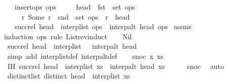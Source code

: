 \begin{isabellebody}
\ \ \ {\isachardoublequoteopen}insert{\isacharunderscore}ops\ ops{\isachardoublequoteclose}\isanewline
\ \ \ \ \ {\isachardoublequoteopen}head\ {\isasymnotin}\ fst\ {\isacharbackquote}\ set\ ops{\isachardoublequoteclose}\isanewline
\ \ \ \ \ {\isachardoublequoteopen}{\isasymAnd}r{\isachardot}\ Some\ r\ {\isasymin}\ snd\ {\isacharbackquote}\ set\ ops\ {\isasymLongrightarrow}\ r\ {\isasymnoteq}\ head{\isachardoublequoteclose}\isanewline
\ \ \ {\isachardoublequoteopen}succ{\isacharunderscore}rel\ {\isacharparenleft}head\ {\isacharhash}\ interp{\isacharunderscore}list\ ops{\isacharparenright}\ {\isacharequal}\ interp{\isacharunderscore}alt\ head\ ops{\isachardoublequoteclose}\isanewline
%
\isadelimproof
%
\endisadelimproof
%
\isatagproof
{}\isamarkupfalse%
\ assms\ \isamarkupfalse%
{\isacharparenleft}induction\ ops\ rule{\isacharcolon}\ List{\isachardot}rev{\isacharunderscore}induct{\isacharparenright}\isanewline
\ \ \isamarkupfalse%
\ Nil\isanewline
\ \ \isamarkupfalse%
\ \isamarkupfalse%
\ {\isachardoublequoteopen}succ{\isacharunderscore}rel\ {\isacharparenleft}head\ {\isacharhash}\ interp{\isacharunderscore}list\ {\isacharbrackleft}{\isacharbrackright}{\isacharparenright}\ {\isacharequal}\ interp{\isacharunderscore}alt\ head\ {\isacharbrackleft}{\isacharbrackright}{\isachardoublequoteclose}\isanewline
\ \ \ \ \isamarkupfalse%
\ {\isacharparenleft}simp\ add{\isacharcolon}\ interp{\isacharunderscore}list{\isacharunderscore}def\ interp{\isacharunderscore}alt{\isacharunderscore}def{\isacharparenright}\isanewline
{}\isamarkupfalse%
\isanewline
\ \ \isamarkupfalse%
\ {\isacharparenleft}snoc\ x\ xs{\isacharparenright}\isanewline
\ \ \isamarkupfalse%
\ IH{\isacharcolon}\ {\isachardoublequoteopen}succ{\isacharunderscore}rel\ {\isacharparenleft}head\ {\isacharhash}\ interp{\isacharunderscore}list\ xs{\isacharparenright}\ {\isacharequal}\ interp{\isacharunderscore}alt\ head\ xs{\isachardoublequoteclose}\isanewline
\ \ \ \ \isamarkupfalse%
\ snoc\ \isamarkupfalse%
\ auto\isanewline
\ \ \isamarkupfalse%
\ distinct{\isacharunderscore}list{\isacharcolon}\ {\isachardoublequoteopen}distinct\ {\isacharparenleft}head\ {\isacharhash}\ interp{\isacharunderscore}list\ xs{\isacharparenright}{\isachardoublequoteclose}\isanewline
\ \ \isamarkupfalse%
\ {\isacharminus}\isanewline
\ \ \ \ \isamarkupfalse%

\end{isabellebody}
